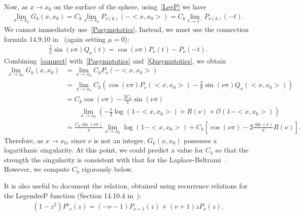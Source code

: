 \documentclass[final]{siamltex}
\newcommand{\C}{C_k}
\newcommand{\bigO} {\mathcal{O}}
\begin{document}
Now, as $x\rightarrow x_{0}$ on the surface of the sphere,
using~\eqref{LegP} we have 
\begin{align*}
  \lim_{x\rightarrow x_{0}}G_k(x,x_{0}) =
  \C\lim_{x\rightarrow x_{0}} P_{\nu(k)}\left(-<x,x_{0}>\right) =
  \C\lim_{t\rightarrow 1^-}P_{\nu(k)}\left(-t\right).
\end{align*}
We cannot immediately use~\eqref{Pasymptotics}. Instead, we must use the connection formula 14.9.10 in~\cite{fatAbramowitz} (again setting $\mu=0$):
\begin{align}
  \label{connect}
  \frac{2}{\pi}\sin(\nu \pi)Q_\nu(t)= \cos(\nu\pi)P_\nu(t) - P_\nu(-t).
\end{align}
Combining~\eqref{connect} with~\eqref{Pasymptotics}
and~\eqref{Qasymptotics}, we obtain
\begin{align}
  \lim_{x\rightarrow x_{0}}G_k(x,x_{0}) &= \lim_{x\rightarrow x_{0}}
      \C P_{\nu}(-<x,x_{0}>) \nonumber \\
  &= \lim_{x\rightarrow x_{0} }\C\left(\cos(\nu\pi)
  P_{\nu}(<x,x_{0}>) - 
      \frac{2}{\pi}\sin(\nu \pi)Q_{\nu}(<x,x_0>)\right) \nonumber \\
  &= \C\cos(\nu\pi) -\frac{2\C}{\pi}\sin(\nu\pi) \\
  & \qquad \lim_{x\rightarrow x_0} \left(-\frac{1}{2}\log(1-<x,x_0>) + R(\nu) +
      \bigO(1-<x,x_0>)\right) \nonumber \\
  &=\frac{\C\sin(\nu\pi)}{\pi}\lim_{x\rightarrow x_0}
      \log(1-<x,x_0>) + \C\left[\cos(\nu\pi)-
      2\frac{\sin(\nu)}{\pi}R(\nu)\right].
  \label{e:logSingularity}
\end{align}
Therefore, as $x\rightarrow x_0$, since $\nu$ is not an integer,
$G_k(x,x_0)$ possesses a logarithmic singularity.  At this point, we
could predict a value for $\C$ so that the strength the singularity is
consistent with that for the Laplace-Beltrami~\cite{gemmrich}.
However, we compute $\C$ rigorously below.

It is also useful to document the relation, obtained using recurrence
relations for the LegendreP function (Section 14.10.4
in~\cite{fatAbramowitz}):
\begin{align*} 
  (1-z^2) P'_\nu(z) = (-\nu-1) P_{\nu+1}(z) + (\nu+1)z P_\nu(z).
\end{align*}
\end{document}
